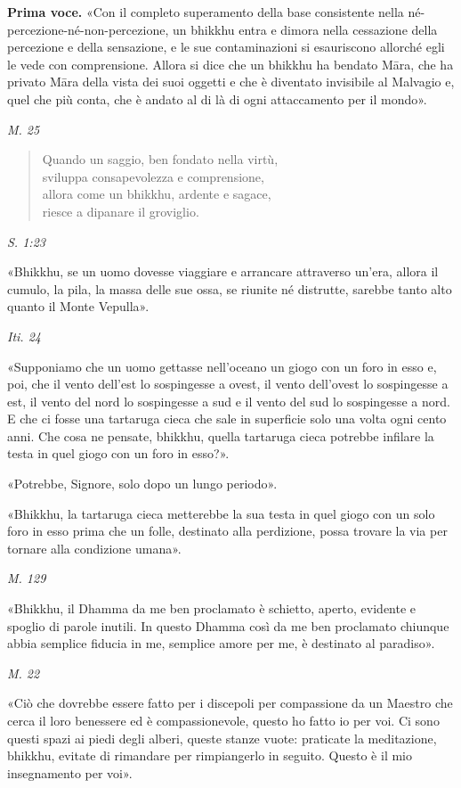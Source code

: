 \textbf{Prima voce.} «Con il completo superamento della base consistente nella
né-percezione-né-non-percezione, un bhikkhu entra e dimora nella
cessazione della percezione e della sensazione, e le sue contaminazioni
si esauriscono allorché egli le vede con comprensione. Allora si dice
che un bhikkhu ha bendato Māra, che ha privato Māra della vista dei suoi
oggetti e che è diventato invisibile al Malvagio e, quel che più conta,
che è andato al di là di ogni attaccamento per il mondo».


\emph{M. 25}


\begin{quotation}
Quando un saggio, ben fondato nella virtù, \\
sviluppa consapevolezza e comprensione, \\
allora come un bhikkhu, ardente e sagace, \\
riesce a dipanare il groviglio.
\end{quotation}

\emph{S. 1:23}


«Bhikkhu, se un uomo dovesse viaggiare e arrancare attraverso un’era,
allora il cumulo, la pila, la massa delle sue ossa, se riunite né
distrutte, sarebbe tanto alto quanto il Monte Vepulla».


\emph{Iti. 24}


«Supponiamo che un uomo gettasse nell’oceano un giogo con un foro in
esso e, poi, che il vento dell’est lo sospingesse a ovest, il vento
dell’ovest lo sospingesse a est, il vento del nord lo sospingesse a sud
e il vento del sud lo sospingesse a nord. E che ci fosse una tartaruga
cieca che sale in superficie solo una volta ogni cento anni. Che cosa ne
pensate, bhikkhu, quella tartaruga cieca potrebbe infilare la testa in
quel giogo con un foro in esso?».


«Potrebbe, Signore, solo dopo un lungo periodo».


«Bhikkhu, la tartaruga cieca metterebbe la sua testa in quel giogo con
un solo foro in esso prima che un folle, destinato alla perdizione,
possa trovare la via per tornare alla condizione umana».


\emph{M. 129}


«Bhikkhu, il Dhamma da me ben proclamato è schietto, aperto, evidente e
spoglio di parole inutili. In questo Dhamma così da me ben proclamato
chiunque abbia semplice fiducia in me, semplice amore per me, è
destinato al paradiso».


\emph{M. 22}


«Ciò che dovrebbe essere fatto per i discepoli per compassione da un
Maestro che cerca il loro benessere ed è compassionevole, questo ho
fatto io per voi. Ci sono questi spazi ai piedi degli alberi, queste
stanze vuote: praticate la meditazione, bhikkhu, evitate di rimandare
per rimpiangerlo in seguito. Questo è il mio insegnamento per voi».


